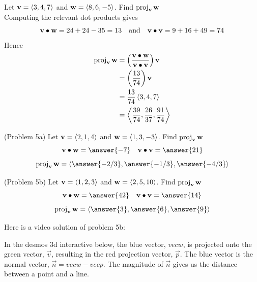 \documentclass[handout]{ximera}
\begin{document}
\begin{example}[Example 5]
Let $\mathbf v = \left\langle 3,4,7\right\rangle$ and $\mathbf w = \left\langle 8,6,-5\right\rangle$. Find $\operatorname{proj}_{\mathbf{v}} \mathbf{w}$\\
Computing the relevant dot products gives
\[
\mathbf v \bullet \mathbf w = 24+24 -35 = 13 \quad \text{and} \quad \mathbf v \bullet \mathbf v =9 + 16+49 = 74
\]
Hence
\begin{align*}
\operatorname{proj}_{\mathbf{v}} \mathbf{w} &= \left(\frac{\mathbf{v} \bullet \mathbf{w}}{\mathbf{v} \bullet \mathbf{v}}\right) \mathbf{v}\\
                        &= \left(\frac{13}{74}\right) \mathbf v\\
                        &= \frac{13}{74} \left\langle 3,4,7\right\rangle\\
                        &= \left\langle \frac{39}{74},\frac{26}{37},\frac{91}{74}\right\rangle
\end{align*}
\end{example}

\begin{problem}(Problem 5a)
Let $\mathbf v = \left\langle 2,1,4\right\rangle$ and $\mathbf w = \left\langle 1,3,-3\right\rangle$. Find $\operatorname{proj}_{\mathbf{v}} \mathbf{w}$\\
\[
\vec v \dotp \vec w = \answer{-7} \quad \vec v \dotp \vec v = \answer{21} 
\]
\[
 \proj_{\vec{v}} \vec{w} = \vector{\answer{-2/3},\answer{-1/3},\answer{-4/3}}
\]
\end{problem}

\begin{problem}(Problem 5b)
Let $\mathbf v = \left\langle 1,2,3\right\rangle$ and $\mathbf w = \left\langle 2,5,10\right\rangle$. Find $\operatorname{proj}_{\mathbf{v}} \mathbf{w}$\\
\[
\vec v \dotp \vec w = \answer{42} \quad \vec v \dotp \vec v = \answer{14} 
\]
\[
 \proj_{\vec{v}} \vec{w} = \vector{\answer{3},\answer{6},\answer{9}}
\]
\end{problem}

Here is a video solution of problem 5b:\\
\begin{foldable}
\end{foldable}

In the desmos 3d interactive below, the blue vector, $vec{w}$, is projected onto the green vector, $\vec{v}$, resulting in the red projection vector, $\vec{p}$.
The blue vector is the normal vector, $\vec{n} = vec{w}-vec{p}$.  The magnitude of $\vec{n}$ gives us the distance between a point and a line.
\begin{center}
\end{center}
\end{document}

